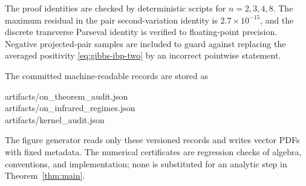 \documentclass[aps,prb,twocolumn,groupedaddress,amsmath,amssymb,
               superscriptaddress,nofootinbib,floatfix]{revtex4-2}
\theoremstyle{plain}
\theoremstyle{definition}
\begin{document}
The proof identities are checked by deterministic scripts for
$n=2,3,4,8$.  The maximum residual in the pair second-variation identity is
$2.7\times10^{-15}$, and the discrete transverse Parseval identity is
verified to floating-point precision.  Negative projected-pair samples are
included to guard against replacing the averaged positivity
\eqref{eq:gibbs-ibp-two} by an incorrect pointwise statement.

The committed machine-readable records are stored as
\begin{center}
\begin{minipage}{0.92\columnwidth}
\ttfamily
artifacts/on\_theorem\_audit.json\\
artifacts/on\_infrared\_regimes.json\\
artifacts/kernel\_audit.json
\end{minipage}
\end{center}
The figure generator reads only these versioned records and writes vector
PDFs with fixed metadata.  The numerical certificates are regression checks
of algebra, conventions, and implementation; none is substituted for an
analytic step in Theorem~\ref{thm:main}.


\end{document}
